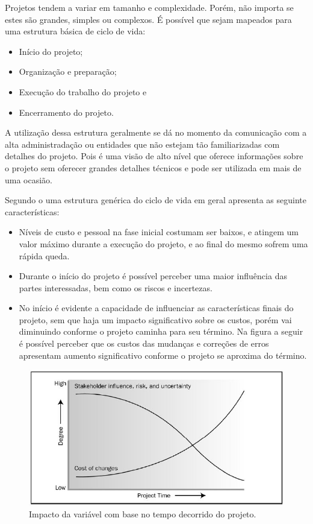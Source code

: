 \documentclass[12pt,a4paper,ruledheader,tocpage=prefix,floatnumber=continuous,pagestart=folhaderosto,font=times]{abnt}
\begin{document}
Projetos tendem a variar em tamanho e complexidade. Porém, não importa se estes são grandes, simples ou complexos. É possível que sejam mapeados para uma
estrutura básica de ciclo de vida\cite{pmbok}:

\begin{itemize}
 \item Início do projeto;
 \item Organização e preparação;
 \item Execução do trabalho do projeto e
 \item Encerramento do projeto.
\end{itemize}

A utilização dessa estrutura geralmente se dá no momento da comunicação com a alta administradação ou entidades que não estejam tão familiarizadas com detalhes
do projeto. Pois é uma visão de alto nível que oferece informações sobre o projeto sem oferecer grandes detalhes técnicos e pode ser utilizada em mais de uma
ocasião.

Segundo o \cite{pmbok} uma estrutura genérica do ciclo de vida em geral apresenta as seguinte características:

\begin{itemize}
 \item Níveis de custo e pessoal na fase inicial costumam ser baixos, e atingem um valor máximo durante a execução do projeto, e ao final do mesmo sofrem
       uma rápida queda.
 \item Durante o início do projeto é possível perceber uma maior influência das partes interessadas, bem como os riscos e incertezas.
 \item No início é evidente a capacidade de influenciar as características finais do projeto, sem que haja um impacto significativo sobre os custos, porém
       vai diminuindo conforme o projeto caminha para seu término. Na figura a seguir é possível perceber que os custos das mudanças e correções de erros
       apresentam aumento significativo conforme o projeto se aproxima do término.
\end{itemize}

\begin{figure}[H]
\centering
\includegraphics[width=.9\textwidth]{pmbok1.jpg}
\caption{Impacto da variável com base no tempo decorrido do projeto\cite{pmbok}.}
\end{figure}
\end{document}
